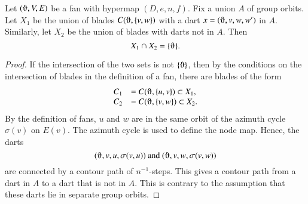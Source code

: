 %

\begin{lemma}  
Let $(\orgn,V,E)$ be a fan with hypermap 
$(D,e,n,f)$.
Fix a union $A$ of group orbits.
Let $X_1$ be
the union of blades $C(\orgn,{\{v,w\}})$ with a dart 
$x =
(\orgn,v,w,w')$ in $A$.  Similarly, 
let $X_2$ be the union of blades with darts
not in $A$.  
Then $$X_1\cap X_2 = \{\orgn\}.$$
\end{lemma}

\begin{proof} 
If the intersection of the two sets is not $\{\orgn\}$, then
by the conditions on the intersection of blades in the definition
of a fan,
there are blades of the form
  $$
  \begin{array}{lll}
   C_1 &= C(\orgn,\{u,v\})\subset X_1,\\
   C_2 &= C(\orgn,\{v,w\})\subset X_2.\\
  \end{array}
  $$
By the definition of fans, $u$ and $w$ are
in the same orbit of the azimuth cycle $\sigma(v)$ on $E(v)$.
The azimuth cycle is used to define the node map.
Hence, the darts 
   $$
   (\orgn,v,u,\sigma(v,u)) \text{ and }
   (\orgn,v,w,\sigma(v,w))
   $$
are connected by a contour path of $n^{-1}$-steps.
This gives a contour path from a dart in $A$ to a dart that
is not in $A$.
This is contrary to the assumption that these darts lie in
separate group orbits.
\end{proof}



